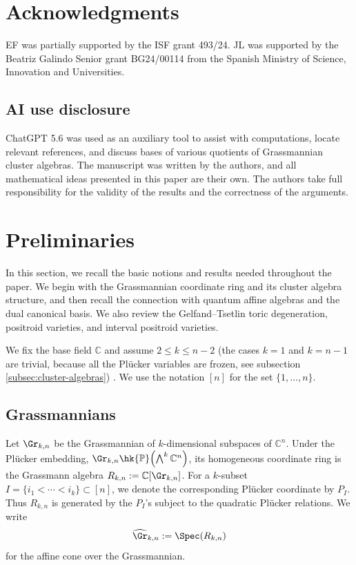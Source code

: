 \documentclass[11pt]{amsart}
\numberwithin{equation}{section}
\newcommand{\bC}{{\mathbb C}}
\newcommand{\bP}{{\mathbb P}}
\begin{document}
\section*{Acknowledgments}
EF was partially supported by the ISF grant 493/24. JL was supported by the Beatriz Galindo Senior grant BG24/00114 from the Spanish Ministry of Science, Innovation and Universities. 

\subsection*{AI use disclosure} ChatGPT 5.6 was used as an auxiliary tool to assist with computations, locate relevant references, and discuss bases of various quotients of Grassmannian cluster algebras. The manuscript was written by the authors, and all mathematical ideas presented in this paper are their own. The authors take full responsibility for the validity of the results and the correctness of the arguments.

\section{Preliminaries}\label{sec:prelim}

In this section, we recall the basic notions and results needed throughout the paper. We begin with the Grassmannian coordinate ring and its cluster algebra structure, and then recall the connection with quantum affine algebras and the dual canonical basis. We also review the Gelfand--Tsetlin toric degeneration, positroid varieties, and interval positroid varieties. 

We fix the base field $\bC$ and assume $2\le k\le n-2$ (the cases $k=1$ and $k=n-1$ are trivial, because all the Pl\"ucker variables are frozen, see subsection \ref{subsec:cluster-algebras}) .
We use the notation $[n]$ for the set $\{1,\dots,n\}$.
\subsection{Grassmannians}
\label{subsec:grassmannians}

Let $\Gr_{k,n}$ be the Grassmannian of $k$-dimensional subspaces of
$\bC^n$.  Under the Pl\"ucker embedding, $\Gr_{k,n}\hk \bP\!\left(\bigwedge^k\bC^n\right)$,
its homogeneous coordinate ring is the Grassmann algebra
$R_{k,n}:=\bC[\Gr_{k,n}]$.
For a $k$-subset $I=\{i_1<\cdots<i_k\}\subset [n]$,
we denote the corresponding Pl\"ucker coordinate by $P_I$.  Thus
$R_{k,n}$ is generated by the $P_I$'s subject to the quadratic
Pl\"ucker relations.  We write
\[
   \widehat{\Gr}_{k,n}:=\Spec(R_{k,n})
\]
for the affine cone over the Grassmannian.
\end{document}
